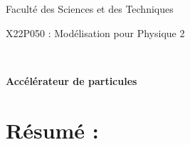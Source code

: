 \documentclass[a4paper,11pt]{article}			%
\begin{document}
\vspace*{-2cm}

\centerline{\LARGE Faculté des Sciences et des Techniques}
\vspace*{0.5cm}  
\centerline{\LARGE X22P050 : Modélisation pour Physique  2 }  
\vspace*{0.5cm}  
\\
\centerline{\bf\Large Accélérateur de particules }
\vspace*{2cm}
\noindent

\section*{Résumé :}
\end{document}

